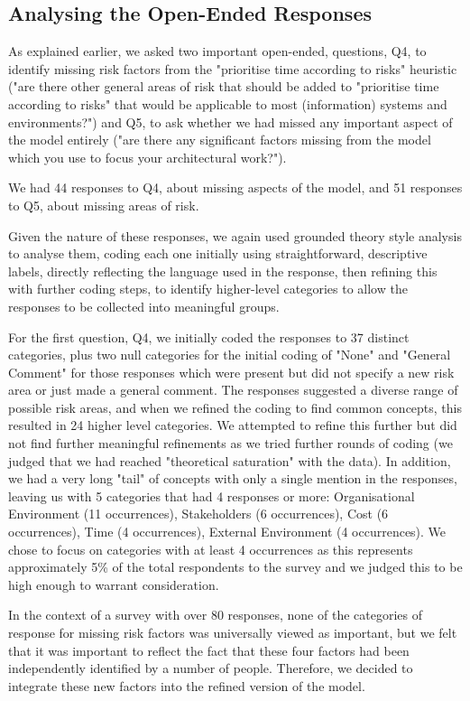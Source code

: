 \subsection{Analysing the Open-Ended Responses}
\label{sec:openended}

As explained earlier, we asked two important open-ended, questions, Q4, to identify missing risk factors from the "prioritise time according to risks" heuristic ("are there other general areas of risk that should be added to "prioritise time according to risks" that would be applicable to most (information) systems and environments?") and Q5, to ask whether we had missed any important aspect of the model entirely ("are there any significant factors missing from the model which you use to focus your architectural work?").

We had 44 responses to Q4, about missing aspects of the model, and 51 responses to Q5, about missing areas of risk.

Given the nature of these responses, we again used grounded theory style analysis to analyse them, coding each one initially using straightforward, descriptive labels, directly reflecting the language used in the response, then refining this with further coding steps, to identify higher-level categories to allow the responses to be collected into meaningful groups.

For the first question, Q4, we initially coded the responses to 37 distinct categories, plus two null categories for the initial coding of "None" and "General Comment" for those responses which were present but did not specify a new risk area or just made a general comment.  The responses suggested a diverse range of possible risk areas, and when we refined the coding to find common concepts, this resulted in 24 higher level categories.  We attempted to refine this further but did not find further meaningful refinements as we tried further rounds of coding (we judged that we had reached "theoretical saturation" with the data).   In addition, we had a very long "tail" of concepts with only a single mention in the responses, leaving us with 5 categories that had 4 responses or more: Organisational Environment (11 occurrences), Stakeholders (6 occurrences), Cost (6 occurrences), Time (4 occurrences), External Environment (4 occurrences).  We chose to focus on categories with at least 4 occurrences as this represents approximately 5\% of the total respondents to the survey and we judged this to be high enough to warrant consideration.

In the context of a survey with over 80 responses, none of the categories of response for missing risk factors was universally viewed as important, but we felt that it was important to reflect the fact that these four factors had been independently identified by a number of people.  Therefore, we decided to integrate these new factors into the refined version of the model.

